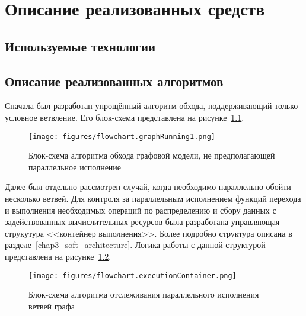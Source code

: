 \chapter{Описание реализованных средств}\label{chap4_soft_testing}
\section{Используемые технологии}

\section{Описание реализованных алгоритмов}\label{sec:algorithm_desc}

Сначала был разработан упрощённый алгоритм обхода, поддерживающий только условное ветвление. Его блок-схема представлена на рисунке~\ref{fig:flowchartNoBranching}.
\begin{figure}[!ht]
    \centering
    \texttt{[image: figures/flowchart.graphRunning1.png]}
    \caption{Блок-схема алгоритма обхода графовой модели, не предполагающей параллельное исполнение}
    \label{fig:flowchartNoBranching}
\end{figure}

Далее был отдельно рассмотрен случай, когда необходимо параллельно обойти несколько ветвей. Для контроля за параллельным исполнением функций перехода и выполнения необходимых операций по распределению и сбору данных с задействованных вычислительных ресурсов была разработана управляющая струкутура <<контейнер выполнения>>. Более подробно структура описана в разделе~\ref{chap3_soft_architecture}. Логика работы с данной структурой представлена на рисунке~\ref{fig:flowchartExecutionContainer}.
\begin{figure}[H]
    \centering
    \texttt{[image: figures/flowchart.executionContainer.png]}
    \caption{Блок-схема алгоритма отслеживания параллельного исполнения ветвей графа}
    \label{fig:flowchartExecutionContainer}
\end{figure}

